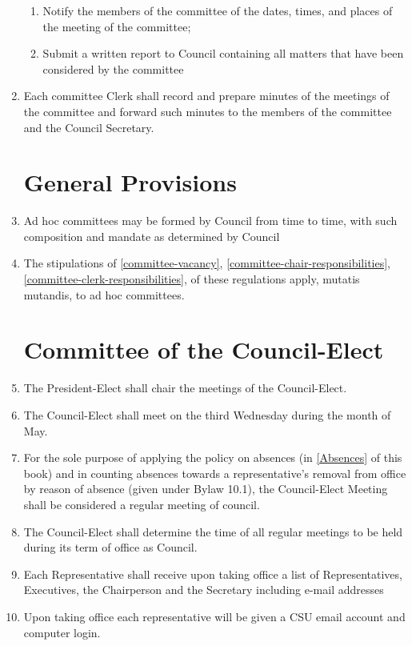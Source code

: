 \documentclass[oneside]{book}
\begin{document}
\begin{enumerate}
\begin{enumerate}
\item Notify the members of the committee of the dates, times, and places
of the meeting of the committee; 
\item Submit a written report to Council containing all matters that have
been considered by the committee 
\end{enumerate}
\item \label{committee-clerk-responsibilities} Each committee Clerk shall record and prepare minutes of the meetings
of the committee and forward such minutes to the members of the committee
and the Council Secretary. 

\section{\label{Committees_General_Provisions}General Provisions }
\item Ad hoc committees may be formed by Council from time to time, with
such composition and mandate as determined by Council 
\item The stipulations of \autoref{committee-vacancy}, \autoref{committee-chair-responsibilities}, \autoref{committee-clerk-responsibilities}, of these regulations apply,
mutatis mutandis, to ad hoc committees. 

\section{\label{Committee_of_the_Council-Elect}Committee of the Council-Elect }
\item The President-Elect shall chair the meetings of the Council-Elect. 
\item The Council-Elect shall meet on the third Wednesday during the month
of May. 
\item For the sole purpose of applying the policy on absences (in \autoref{Absences} of this book) and in counting absences towards a representative's removal from office by reason of absence (given under Bylaw 10.1), the Council-Elect Meeting shall be considered a regular meeting of council.
\item The Council-Elect shall determine the time of all regular meetings
to be held during its term of office as Council. 
\item Each Representative shall receive upon taking office a list of Representatives,
Executives, the Chairperson and the Secretary including e-mail addresses 
\item Upon taking office each representative will be given a CSU email account
and computer login. 


\end{enumerate}
\end{document}
